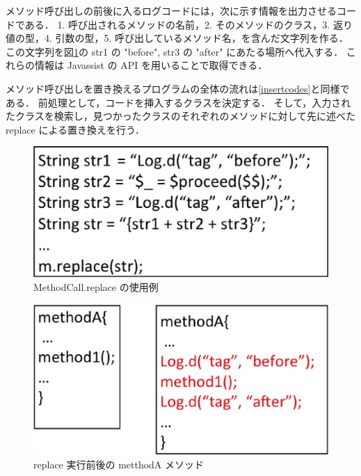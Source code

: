 メソッド呼び出しの前後に入るログコードには，次に示す情報を出力させるコードである．
1. 呼び出されるメソッドの名前，2. そのメソッドのクラス，3. 返り値の型，4. 引数の型，5. 呼び出しているメソッド名，を含んだ文字列を作る．
この文字列を図\ref{replace}の str1 の "before", str3 の "after" にあたる場所へ代入する．
これらの情報は Javassist の API を用いることで取得できる．

メソッド呼び出しを置き換えるプログラムの全体の流れは\ref{insertcodes}と同様である．
前処理として，コードを挿入するクラスを決定する．
そして，入力されたクラスを検索し，見つかったクラスのそれぞれのメソッドに対して先に述べた replace による置き換えを行う．

\begin{figure}[t]
\begin{center}
\graphicspath{{./epsfiles/}}
\includegraphics[scale=0.3]{replace.eps}
\end{center}
\caption{MethodCall.replace の使用例}
\label{replace}
\end{figure}

\begin{figure}[t]
\begin{center}
\graphicspath{{./epsfiles/}}
\includegraphics[scale=0.3]{methoda.eps}
\end{center}
\caption{replace 実行前後の metthodA メソッド}
\label{methoda}
\end{figure}

